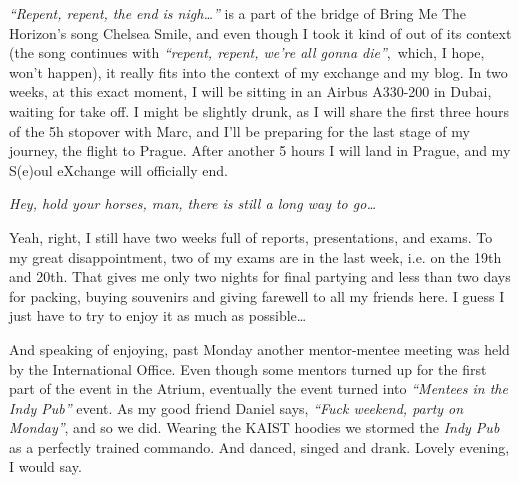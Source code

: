\begin{post}
	\begin{content}
\textit{``Repent, repent, the end is nigh{\ldots}''} is a part of the bridge of Bring Me The Horizon's song Chelsea Smile, and even though I took it kind of out of its context (the song continues with \textit{``repent, repent, we're all gonna die''}, which, I hope, won't happen), it really fits into the context of my exchange and my blog. In two weeks, at this exact moment, I will be sitting in an Airbus A330-200 in Dubai, waiting for take off. I might be slightly drunk, as I will share the first three hours of the 5h stopover with Marc, and I'll be preparing for the last stage of my journey, the flight to Prague. After another 5 hours I will land in Prague, and my S(e)oul eXchange will officially end.

\textit{Hey, hold your horses, man, there is still a long way to go{\ldots}}

Yeah, right, I still have two weeks full of reports, presentations, and exams. To my great disappointment, two of my exams are in the last week, i.e. on the 19th and 20th. That gives me only two nights for final partying and less than two days for packing, buying souvenirs and giving farewell to all my friends here. I guess I just have to try to enjoy it as much as possible\ldots

And speaking of enjoying, past Monday another mentor-mentee meeting was held by the International Office. Even though some mentors turned up for the first part of the event in the Atrium, eventually the event turned into \textit{``Mentees in the Indy Pub''} event. As my good friend Daniel says, \textit{``Fuck weekend, party on Monday''}, and so we did. Wearing the KAIST hoodies we stormed the \textit{Indy Pub} as a perfectly trained commando. And danced, singed and drank. Lovely evening, I would say.


\end{content}
\end{post}
